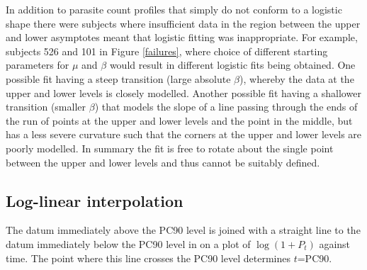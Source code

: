 In addition to parasite count profiles that simply do not conform to a logistic shape there were subjects where insufficient data in the region between the upper and lower asymptotes meant that logistic fitting was inappropriate. For example, subjects 526 and 101 in Figure \ref{failures}, where choice of different starting parameters for $\mu$ and $\beta$ would result in different logistic fits being obtained. One possible fit having a steep transition (large absolute $\beta$), whereby the data at the upper and lower levels is closely modelled. Another possible fit having a shallower transition (smaller $\beta$) that models the slope of a line passing through the ends of the run of points at the upper and lower levels and the point in the middle, but  has a less severe curvature such that the corners at the upper and lower levels are poorly modelled. In summary the fit is free to rotate about the single point between the upper and lower levels and thus cannot be suitably defined.
\subsection{Log-linear interpolation}
The datum immediately above the PC90 level is joined with a straight line to the datum immediately below the PC90 level in on a plot of $\log(1+P_{t})$ against time. The point where this line crosses the PC90 level determines $t$=PC90.

